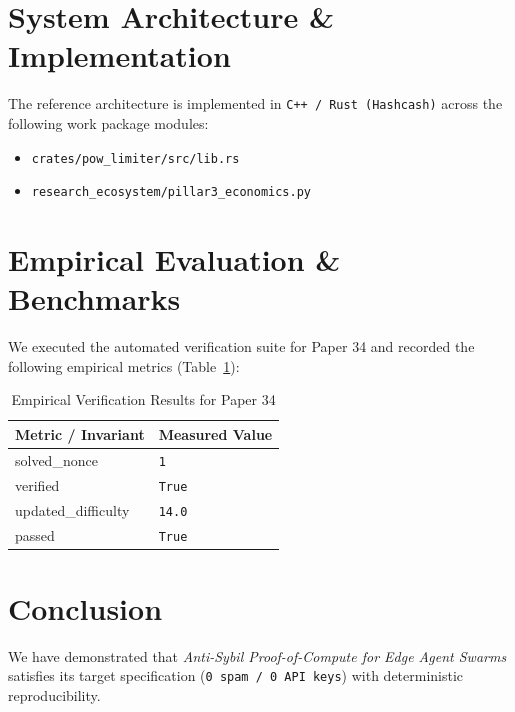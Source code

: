\documentclass[10pt,twocolumn]{article}
\begin{document}
\section{System Architecture \& Implementation}
The reference architecture is implemented in \texttt{C++ / Rust (Hashcash)} across the following work package modules:
\begin{itemize}
  \item \texttt{crates/pow\_limiter/src/lib.rs}
  \item \texttt{research\_ecosystem/pillar3\_economics.py}
\end{itemize}

\section{Empirical Evaluation \& Benchmarks}
We executed the automated verification suite for Paper 34 and recorded the following empirical metrics (Table~\ref{tab:metrics}):

\begin{table}[htbp]
\centering
\caption{Empirical Verification Results for Paper 34}
\label{tab:metrics}
\begin{tabular}{ll}
\toprule
\textbf{Metric / Invariant} & \textbf{Measured Value} \\
\midrule
    solved\_nonce & \texttt{1} \\
    verified & \texttt{True} \\
    updated\_difficulty & \texttt{14.0} \\
    passed & \texttt{True} \\
\bottomrule
\end{tabular}
\end{table}

\section{Conclusion}
We have demonstrated that \textit{Anti-Sybil Proof-of-Compute for Edge Agent Swarms} satisfies its target specification (\texttt{0 spam / 0 API keys}) with deterministic reproducibility.



\end{document}
